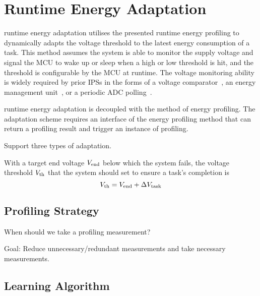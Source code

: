\section{\nn{} Runtime Energy Adaptation} \label{sec:method2}

\nn{} runtime energy adaptation utilises the presented runtime energy profiling to dynamically adapts the voltage threshold to the latest energy consumption of a task. 
This method assumes the system is able to monitor the supply voltage and signal the MCU to wake up or sleep when a high or low threshold is hit, and the threshold is configurable by the MCU at runtime. 
The voltage monitoring ability is widely required by prior IPSs in the forms of a voltage comparator~\cite{kang2018homerun, balsamo2016hibernus++}, an energy management unit~\cite{gomez2016dynamic, maeng2019supporting}, or a periodic ADC polling~\cite{sliper2019efficient}. 

\nn{} runtime energy adaptation is decoupled with the method of energy profiling. 
The adaptation scheme requires an interface of the energy profiling method that can return a profiling result and trigger an instance of profiling.







Support three types of adaptation.

With a target end voltage $V_{\text{end}}$ below which the system fails, the voltage threshold $V_{\text{th}}$ that the system should set to ensure a task's completion is
\begin{equation}
    V_{\text{th}} = V_{\text{end}} + \Delta V_{\text{task}}
\end{equation}

\subsection{Profiling Strategy}

When should we take a profiling measurement?

Goal: Reduce unnecessary/redundant measurements and take necessary measurements.

\subsection{Learning Algorithm}


